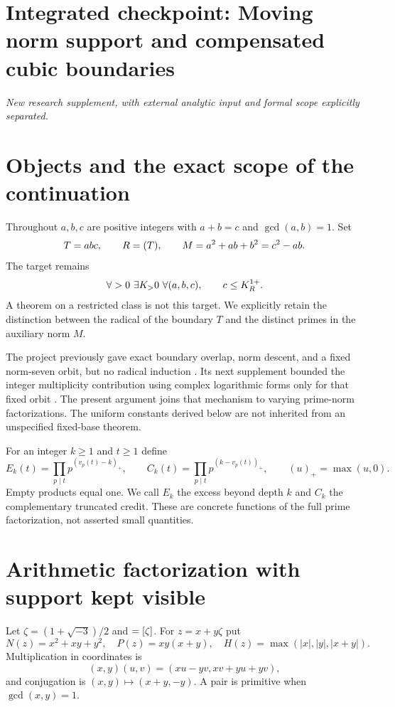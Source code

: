 \clearpage
\begingroup
\let\Z\relax
\newcommand{\Z}{\mathbb Z}
\let\Q\relax
\newcommand{\Q}{\mathbb Q}
\let\N\relax
\newcommand{\N}{\mathbb N}
\let\rad\relax
\newcommand{\rad}{\operatorname{rad}}
\let\eps\relax
\newcommand{\eps}{\varepsilon}
\let\EE\relax
\newcommand{\EE}{\mathcal E}
\let\HH\relax
\newcommand{\HH}{\mathcal A}
\section*{Integrated checkpoint: Moving norm support and compensated cubic boundaries}
\label{checkpoint:moving}
\noindent\textit{New research supplement, with external analytic input and formal scope explicitly separated.}\medskip





\section{Objects and the exact scope of the continuation}
Throughout $a,b,c$ are positive integers with $a+b=c$ and $\gcd(a,b)=1$. Set
\[
 T=abc,\qquad R=\rad(T),\qquad M=a^2+ab+b^2=c^2-ab.
\]
The target remains
\[
 \forall\eps>0\ \exists K_\eps>0\ \forall(a,b,c),\qquad c\le K_\eps R^{1+\eps}.
\]
A theorem on a restricted class is not this target. We explicitly retain the distinction between the radical of the boundary $T$ and the distinct primes in the auxiliary norm $M$.

The project previously gave exact boundary overlap, norm descent, and a fixed norm-seven orbit, but no radical induction \cite{moving:eis}. Its next supplement bounded the integer multiplicity contribution using complex logarithmic forms only for that fixed orbit \cite{moving:rank}. The present argument joins that mechanism to varying prime-norm factorizations. The uniform constants derived below are not inherited from an unspecified fixed-base theorem.

For an integer $k\ge1$ and $t\ge1$ define
\[
 E_k(t)=\prod_{p\mid t}p^{(v_p(t)-k)_+},\qquad
 C_k(t)=\prod_{p\mid t}p^{(k-v_p(t))_+},\qquad (u)_+=\max(u,0).
\]
Empty products equal one. We call $E_k$ the excess beyond depth $k$ and $C_k$ the complementary truncated credit. These are concrete functions of the full prime factorization, not asserted small quantities.

\section{Arithmetic factorization with support kept visible}
Let $\zeta=(1+\sqrt{-3})/2$ and $\EE=\Z[\zeta]$. For $z=x+y\zeta$ put
\[
 N(z)=x^2+xy+y^2,\quad P(z)=xy(x+y),\quad
 H(z)=\max(|x|,|y|,|x+y|).
\]
Multiplication in coordinates is
\[
 (x,y)(u,v)=(xu-yv,xv+yu+yv),
\]
and conjugation is $(x,y)\mapsto(x+y,-y)$. A pair is primitive when $\gcd(x,y)=1$.

